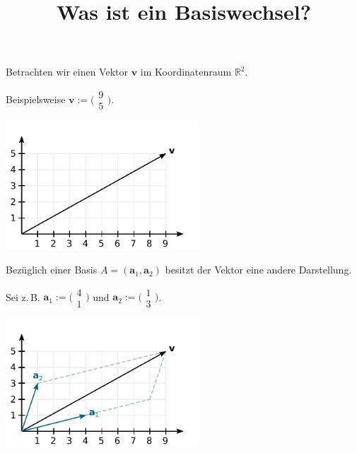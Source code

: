 \documentclass[9pt]{beamer}
\title{Was ist ein Basiswechsel?}
\date{}
\newcommand{\bv}[1]{\mathbf{#1}}
\newcommand{\R}{\mathbb R}
\newcommand{\icol}[1]{
  \big(\!\begin{smallmatrix}#1\end{smallmatrix}\!\big)%
}
\newcommand{\parspace}{\vspace{0.8em}}
\newcommand{\basis}[1]{#1}
\begin{document}
\begin{frame}
\maketitle
\end{frame}

\begin{frame}[t]
\vspace{3em}
Betrachten wir einen Vektor $\bv v$ im Koordinatenraum $\R^2$.

\parspace
Beispielsweise $\bv v:=\icol{9\\ 5}$.\pause

\vspace{-1em}
\begin{center}
\includegraphics[width=72mm]{img/Vektor.pdf}
\end{center}
\end{frame}

\begin{frame}[t]
\vspace{3em}
Bezüglich einer Basis $\basis A=(\bv a_1,\bv a_2)$ besitzt der
Vektor eine andere Darstellung.\pause

\parspace
Sei z.\,B. $\bv a_1 := \icol{4\\ 1}$ und $\bv a_2 := \icol{1\\ 3}$.%
\pause

\vspace{-1.6em}
\begin{center}
\includegraphics[width=72mm]{img/Vektor-in-Basis-A.pdf}
\end{center}
\end{frame}
\end{document}
